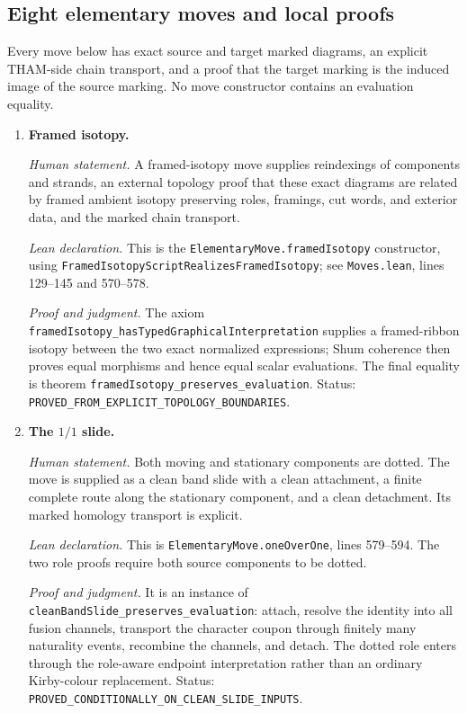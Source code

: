 \subsection{Eight elementary moves and local proofs}
\label{app:lean-eight-moves}

Every move below has exact source and target marked diagrams, an explicit
THAM-side chain transport, and a proof that the target marking is the induced
image of the source marking.  No move constructor contains an evaluation
equality.

\begin{enumerate}[label=\textbf{M\arabic*.},leftmargin=*]

\item \textbf{Framed isotopy.}

\emph{Human statement.}
A framed-isotopy move supplies reindexings of components and strands, an
external topology proof that these exact diagrams are related by framed
ambient isotopy preserving roles, framings, cut words, and exterior data, and
the marked chain transport.

\emph{Lean declaration.}
This is the \texttt{ElementaryMove.framedIsotopy} constructor, using
\nolinkurl{FramedIsotopyScriptRealizesFramedIsotopy}; see
\nolinkurl{Moves.lean}, lines 129--145 and 570--578.

\emph{Proof and judgment.}
The axiom \nolinkurl{framedIsotopy_hasTypedGraphicalInterpretation} supplies a
framed-ribbon isotopy between the two exact normalized expressions; Shum
coherence then proves equal morphisms and hence equal scalar evaluations.
The final equality is theorem
\nolinkurl{framedIsotopy_preserves_evaluation}.  Status:
\nolinkurl{PROVED_FROM_EXPLICIT_TOPOLOGY_BOUNDARIES}.

\item \textbf{The $1/1$ slide.}

\emph{Human statement.}
Both moving and stationary components are dotted.  The move is supplied as a
clean band slide with a clean attachment, a finite complete route along the
stationary component, and a clean detachment.  Its marked homology transport
is explicit.

\emph{Lean declaration.}
This is \texttt{ElementaryMove.oneOverOne}, lines 579--594.  The two role
proofs require both source components to be dotted.

\emph{Proof and judgment.}
It is an instance of \nolinkurl{cleanBandSlide_preserves_evaluation}: attach,
resolve the identity into all fusion channels, transport the character coupon
through finitely many naturality events, recombine the channels, and detach.
The dotted role enters through the role-aware endpoint interpretation rather
than an ordinary Kirby-colour replacement.  Status:
\nolinkurl{PROVED_CONDITIONALLY_ON_CLEAN_SLIDE_INPUTS}.


\end{enumerate}
